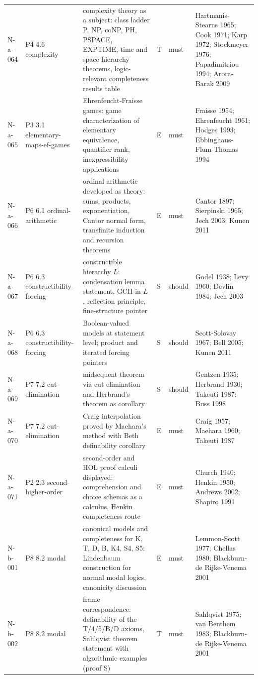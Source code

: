\begin{longtable}{@{}p{0.52in}p{0.85in}p{2.5in}p{0.22in}p{0.42in}p{1.95in}@{}}
N-a-064 & P4 4.6 complexity & complexity theory as a subject: class ladder P, NP, coNP, PH, PSPACE, EXPTIME, time and space hierarchy theorems, logic-relevant completeness results table & T & must & Hartmanis-Stearns 1965; Cook 1971; Karp 1972; Stockmeyer 1976; Papadimitriou 1994; Arora-Barak 2009 \\
N-a-065 & P3 3.1 elementary-maps-ef-games & Ehrenfeucht-Fraisse games: game characterization of elementary equivalence, quantifier rank, inexpressibility applications & E & must & Fraisse 1954; Ehrenfeucht 1961; Hodges 1993; Ebbinghaus-Flum-Thomas 1994 \\
N-a-066 & P6 6.1 ordinal-arithmetic & ordinal arithmetic developed as theory: sums, products, exponentiation, Cantor normal form, transfinite induction and recursion theorems & E & must & Cantor 1897; Sierpinski 1965; Jech 2003; Kunen 2011 \\
N-a-067 & P6 6.3 constructibility-forcing & constructible hierarchy \(L\): condensation lemma statement, \(\mathrm{GCH}\) in \(L\), reflection principle, fine-structure pointer & S & should & Godel 1938; Levy 1960; Devlin 1984; Jech 2003 \\
N-a-068 & P6 6.3 constructibility-forcing & Boolean-valued models at statement level; product and iterated forcing pointers & S & should & Scott-Solovay 1967; Bell 2005; Kunen 2011 \\
N-a-069 & P7 7.2 cut-elimination & midsequent theorem via cut elimination and Herbrand's theorem as corollary & S & should & Gentzen 1935; Herbrand 1930; Takeuti 1987; Buss 1998 \\
N-a-070 & P7 7.2 cut-elimination & Craig interpolation proved by Maehara's method with Beth definability corollary & E & must & Craig 1957; Maehara 1960; Takeuti 1987 \\
N-a-071 & P2 2.3 second-higher-order & second-order and HOL proof calculi displayed: comprehension and choice schemas as a calculus, Henkin completeness route & E & must & Church 1940; Henkin 1950; Andrews 2002; Shapiro 1991 \\
N-b-001 & P8 8.2 modal & canonical models and completeness for K, T, D, B, K4, S4, S5: Lindenbaum construction for normal modal logics, canonicity discussion & E & must & Lemmon-Scott 1977; Chellas 1980; Blackburn-de Rijke-Venema 2001 \\
N-b-002 & P8 8.2 modal & frame correspondence: definability of the T/4/5/B/D axioms, Sahlqvist theorem statement with algorithmic examples (proof S) & T & must & Sahlqvist 1975; van Benthem 1983; Blackburn-de Rijke-Venema 2001 \\

\end{longtable}
